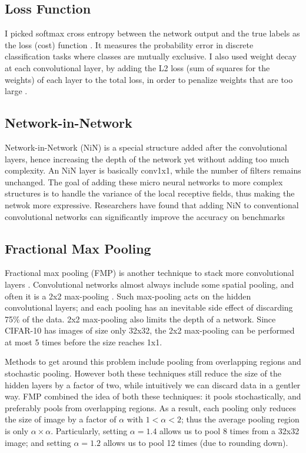 \documentclass[conference]{IEEEtran}
\begin{document}
\subsection*{Loss Function}
I picked softmax cross entropy between the network output and the true labels as the loss (cost) function \cite{cross}. It measures the probability error in discrete classification tasks where classes are mutually exclusive. I also used weight decay at each convolutional layer, by adding the L2 loss (sum of squares for the weights) of each layer to the total loss, in order to penalize weights that are too large \cite{decay}.

\subsection*{Network-in-Network}
Network-in-Network (NiN) is a special structure added after the convolutional layers, hence increasing the depth of the network yet without adding too much complexity\cite{nin}. An NiN layer is basically conv1x1, while the number of filters remains unchanged. The goal of adding these micro neural networks to more complex structures is to handle the variance of the local receptive fields, thus making the netwok more expressive. Researchers have found that adding NiN to conventional convolutional networks can significantly improve the accuracy on benchmarks\cite{sparse,fmp,nin}

\subsection*{Fractional Max Pooling}
Fractional max pooling (FMP) is another technique to stack more convolutional layers \cite{fmp}. Convolutional networks almost always include some spatial pooling, and often it is a 2x2 max-pooling \cite{conv}. Such max-pooling acts on the hidden convolutional layers; and each pooling has an inevitable side effect of discarding 75\% of the data. 2x2 max-pooling also limits the depth of a network. Since CIFAR-10 has images of size only 32x32, the 2x2 max-pooling can be performed at most 5 times before the size reaches 1x1.

Methods to get around this problem include pooling from overlapping regions and stochastic pooling\cite{fmp}. However both these techniques still reduce the size of the hidden layers by a factor of two, while intuitively we can discard data in a gentler way. FMP combined the idea of both these techniques: it pools stochastically, and preferably pools from overlapping regions. As a result, each pooling only reduces the size of image by a factor of $\alpha$ with $1 < \alpha < 2$; thus the average pooling region is only $\alpha \times \alpha$\cite{fmp}. Particularly, setting $\alpha =1.4$ allows us to pool $8$ times from a 32x32 image; and setting $\alpha=1.2$ allows us to pool 12 times (due to rounding down). 
\end{document}
